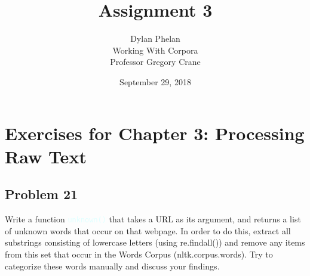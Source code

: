 \documentclass[11pt]{article}
\author{ 
	Dylan Phelan \\ 
	Working With Corpora \\ 
	Professor Gregory Crane 
}
\title{Assignment 3}
\date{September 29, 2018}
\newcommand{\codeword}[1]{
	\texttt{\textcolor{lightCyan}{#1}}
}
\begin{document}
\maketitle

\section*{Exercises for Chapter 3: Processing Raw Text}
\subsection*{Problem 21}

 Write a function \codeword{unknown()} that takes a URL as its argument, and returns a list of unknown words that occur on that webpage. In order to do this, extract all substrings consisting of lowercase letters (using re.findall()) and remove any items from this set that occur in the Words Corpus (nltk.corpus.words). Try to categorize these words manually and discuss your findings.
\end{document}
